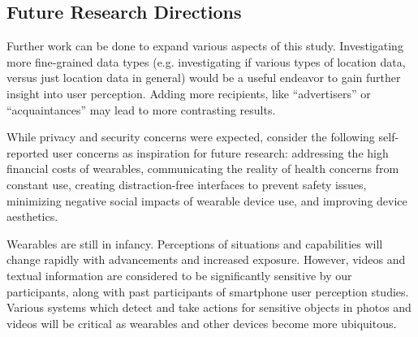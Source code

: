 \subsection{Future Research Directions}
Further work can be done to expand various aspects of this study. Investigating more fine-grained data types (e.g. investigating if various types of location data, versus just location data in general) would be a useful endeavor to gain further insight into user perception. Adding more recipients, like ``advertisers'' or ``acquaintances'' may lead to more contrasting results.  

While privacy and security concerns were expected, consider the following self-reported user concerns as inspiration for future research: addressing the high financial costs of wearables, communicating the reality of health concerns from constant use, creating distraction-free interfaces to prevent safety issues, minimizing negative social impacts of wearable device use, and improving device aesthetics.  

Wearables are still in infancy. Perceptions of situations and capabilities will change rapidly with advancements and increased exposure. However, videos and textual information are considered to be significantly sensitive by our participants, along with past participants of smartphone user perception studies. Various systems which detect and take actions for sensitive objects in photos and videos will be critical as wearables and other devices become more ubiquitous.